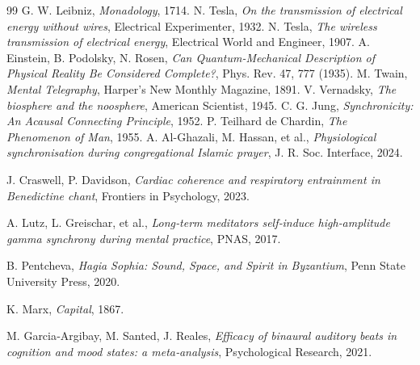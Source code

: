 \documentclass[12pt,a4paper]{article}
\begin{document}
	\begin{thebibliography}{99}
		 G. W. Leibniz, \emph{Monadology}, 1714.
		 N. Tesla, \emph{On the transmission of electrical energy without wires}, Electrical Experimenter, 1932.
		 N. Tesla, \emph{The wireless transmission of electrical energy}, Electrical World and Engineer, 1907.
		 A. Einstein, B. Podolsky, N. Rosen, \emph{Can Quantum-Mechanical Description of Physical Reality Be Considered Complete?}, Phys. Rev. 47, 777 (1935).
		 M. Twain, \emph{Mental Telegraphy}, Harper's New Monthly Magazine, 1891.
		 V. Vernadsky, \emph{The biosphere and the noosphere}, American Scientist, 1945.
		 C. G. Jung, \emph{Synchronicity: An Acausal Connecting Principle}, 1952.
		 P. Teilhard de Chardin, \emph{The Phenomenon of Man}, 1955.
		A. Al-Ghazali, M. Hassan, et al., 
		\emph{Physiological synchronisation during congregational Islamic prayer}, 
		J. R. Soc. Interface, 2024.
		
		J. Craswell, P. Davidson, 
		\emph{Cardiac coherence and respiratory entrainment in Benedictine chant}, 
		Frontiers in Psychology, 2023.
		
		A. Lutz, L. Greischar, et al., 
		\emph{Long‑term meditators self‑induce high‑amplitude gamma synchrony during mental practice}, 
		PNAS, 2017.
		
		B. Pentcheva, 
		\emph{Hagia Sophia: Sound, Space, and Spirit in Byzantium}, 
		Penn State University Press, 2020.
		
		 K. Marx, \emph{Capital}, 1867.
		
		M. Garcia‑Argibay, M. Santed, J. Reales, 
		\emph{Efficacy of binaural auditory beats in cognition and mood states: a meta‑analysis}, 
		Psychological Research, 2021.
	\end{thebibliography}
	
	
\end{document}
